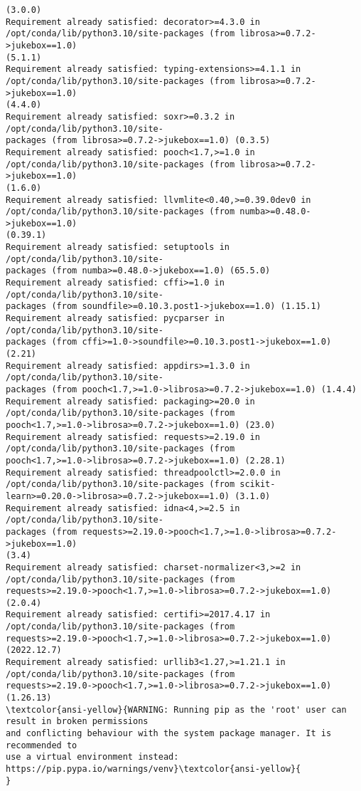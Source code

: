 \documentclass[11pt]{article}
\begin{document}
\begin{Verbatim}[commandchars=\\\{\}]
(3.0.0)
Requirement already satisfied: decorator>=4.3.0 in
/opt/conda/lib/python3.10/site-packages (from librosa>=0.7.2->jukebox==1.0)
(5.1.1)
Requirement already satisfied: typing-extensions>=4.1.1 in
/opt/conda/lib/python3.10/site-packages (from librosa>=0.7.2->jukebox==1.0)
(4.4.0)
Requirement already satisfied: soxr>=0.3.2 in /opt/conda/lib/python3.10/site-
packages (from librosa>=0.7.2->jukebox==1.0) (0.3.5)
Requirement already satisfied: pooch<1.7,>=1.0 in
/opt/conda/lib/python3.10/site-packages (from librosa>=0.7.2->jukebox==1.0)
(1.6.0)
Requirement already satisfied: llvmlite<0.40,>=0.39.0dev0 in
/opt/conda/lib/python3.10/site-packages (from numba>=0.48.0->jukebox==1.0)
(0.39.1)
Requirement already satisfied: setuptools in /opt/conda/lib/python3.10/site-
packages (from numba>=0.48.0->jukebox==1.0) (65.5.0)
Requirement already satisfied: cffi>=1.0 in /opt/conda/lib/python3.10/site-
packages (from soundfile>=0.10.3.post1->jukebox==1.0) (1.15.1)
Requirement already satisfied: pycparser in /opt/conda/lib/python3.10/site-
packages (from cffi>=1.0->soundfile>=0.10.3.post1->jukebox==1.0) (2.21)
Requirement already satisfied: appdirs>=1.3.0 in /opt/conda/lib/python3.10/site-
packages (from pooch<1.7,>=1.0->librosa>=0.7.2->jukebox==1.0) (1.4.4)
Requirement already satisfied: packaging>=20.0 in
/opt/conda/lib/python3.10/site-packages (from
pooch<1.7,>=1.0->librosa>=0.7.2->jukebox==1.0) (23.0)
Requirement already satisfied: requests>=2.19.0 in
/opt/conda/lib/python3.10/site-packages (from
pooch<1.7,>=1.0->librosa>=0.7.2->jukebox==1.0) (2.28.1)
Requirement already satisfied: threadpoolctl>=2.0.0 in
/opt/conda/lib/python3.10/site-packages (from scikit-
learn>=0.20.0->librosa>=0.7.2->jukebox==1.0) (3.1.0)
Requirement already satisfied: idna<4,>=2.5 in /opt/conda/lib/python3.10/site-
packages (from requests>=2.19.0->pooch<1.7,>=1.0->librosa>=0.7.2->jukebox==1.0)
(3.4)
Requirement already satisfied: charset-normalizer<3,>=2 in
/opt/conda/lib/python3.10/site-packages (from
requests>=2.19.0->pooch<1.7,>=1.0->librosa>=0.7.2->jukebox==1.0) (2.0.4)
Requirement already satisfied: certifi>=2017.4.17 in
/opt/conda/lib/python3.10/site-packages (from
requests>=2.19.0->pooch<1.7,>=1.0->librosa>=0.7.2->jukebox==1.0) (2022.12.7)
Requirement already satisfied: urllib3<1.27,>=1.21.1 in
/opt/conda/lib/python3.10/site-packages (from
requests>=2.19.0->pooch<1.7,>=1.0->librosa>=0.7.2->jukebox==1.0) (1.26.13)
\textcolor{ansi-yellow}{WARNING: Running pip as the 'root' user can result in broken permissions
and conflicting behaviour with the system package manager. It is recommended to
use a virtual environment instead: https://pip.pypa.io/warnings/venv}\textcolor{ansi-yellow}{
}
    \end{Verbatim}
\end{document}
